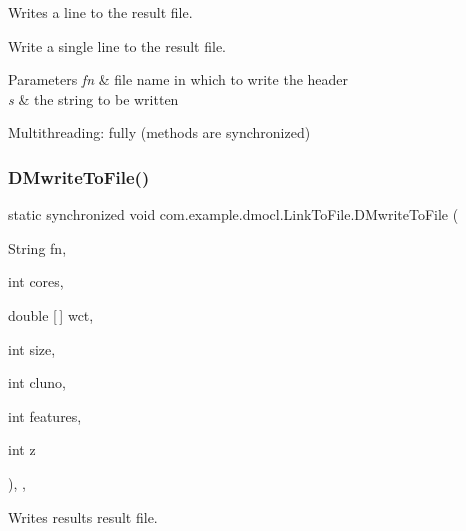 Writes a line to the result file. 

Write a single line to the result file. 
\begin{DoxyParams}{Parameters}
{\em fn} & file name in which to write the header \\
\hline
{\em s} & the string to be written \\
\hline
\end{DoxyParams}
\begin{DoxyParagraph}{Multithreading\+:}
fully (methods are synchronized) 
\end{DoxyParagraph}
\mbox{\label{classcom_1_1example_1_1dmocl_1_1LinkToFile_a14393cd229c571ec80b236d1bd406e43}} 
\subsubsection{\texorpdfstring{D\+Mwrite\+To\+File()}{DMwriteToFile()}\hspace{0.1cm}{\footnotesize\ttfamily [2/2]}}
{\footnotesize\ttfamily static synchronized void com.\+example.\+dmocl.\+Link\+To\+File.\+D\+Mwrite\+To\+File (\begin{DoxyParamCaption}\item[{String}]{fn,  }\item[{int}]{cores,  }\item[{double \mbox{[}$\,$\mbox{]}}]{wct,  }\item[{int}]{size,  }\item[{int}]{cluno,  }\item[{int}]{features,  }\item[{int}]{z }\end{DoxyParamCaption})\hspace{0.3cm}{\ttfamily [inline]}, {\ttfamily [static]}, {\ttfamily [package]}}



Writes results result file. 

